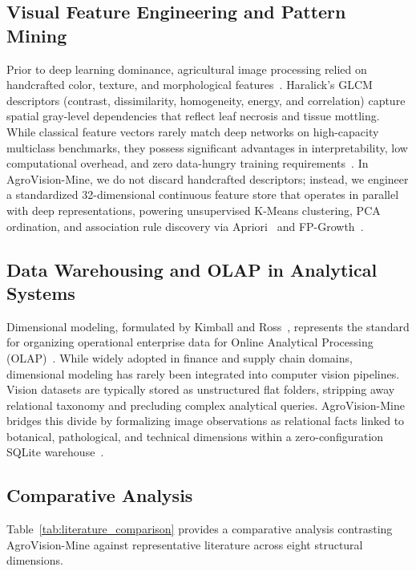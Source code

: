 \documentclass[conference,a4paper]{IEEEtran}
\begin{document}
\subsection{Visual Feature Engineering and Pattern Mining}
Prior to deep learning dominance, agricultural image processing relied on handcrafted color, texture, and morphological features~\cite{haralick1973texture}. Haralick's GLCM descriptors (contrast, dissimilarity, homogeneity, energy, and correlation) capture spatial gray-level dependencies that reflect leaf necrosis and tissue mottling. While classical feature vectors rarely match deep networks on high-capacity multiclass benchmarks, they possess significant advantages in interpretability, low computational overhead, and zero data-hungry training requirements~\cite{pedregosa2011scikit}. In AgroVision-Mine, we do not discard handcrafted descriptors; instead, we engineer a standardized 32-dimensional continuous feature store that operates in parallel with deep representations, powering unsupervised K-Means clustering, PCA ordination, and association rule discovery via Apriori~\cite{agrawal1994apriori} and FP-Growth~\cite{han2000fpgrowth}.

\subsection{Data Warehousing and OLAP in Analytical Systems}
Dimensional modeling, formulated by Kimball and Ross~\cite{kimball2013datawarehouse}, represents the standard for organizing operational enterprise data for Online Analytical Processing (OLAP)~\cite{codd1993olap}. While widely adopted in finance and supply chain domains, dimensional modeling has rarely been integrated into computer vision pipelines. Vision datasets are typically stored as unstructured flat folders, stripping away relational taxonomy and precluding complex analytical queries. AgroVision-Mine bridges this divide by formalizing image observations as relational facts linked to botanical, pathological, and technical dimensions within a zero-configuration SQLite warehouse~\cite{hipp2020sqlite}.

\subsection{Comparative Analysis}
Table~\ref{tab:literature_comparison} provides a comparative analysis contrasting AgroVision-Mine against representative literature across eight structural dimensions.
\end{document}
